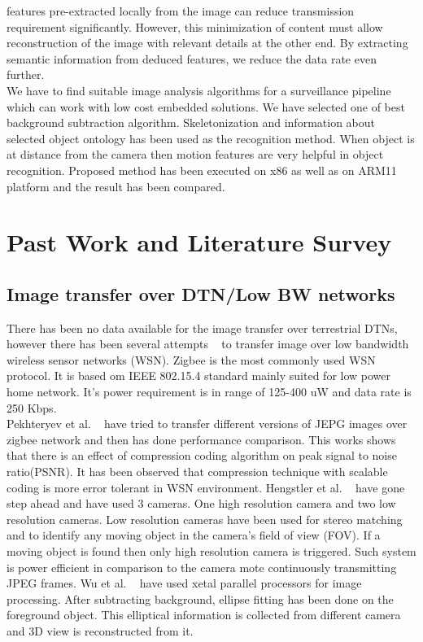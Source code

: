 features pre-extracted locally from the image can reduce transmission
requirement significantly. However, this minimization of content must
allow reconstruction of the image with relevant details at the other
end. By extracting semantic information from deduced features, we
reduce the data rate even further.\\
\indent We have to find suitable image analysis algorithms for a
surveillance pipeline which can work with low cost embedded solutions.
We have selected one of best ~\cite{9} background subtraction algorithm.
Skeletonization and information about selected object ontology has been
used as the recognition method. When object is at distance from the
camera then motion features are very helpful in object recognition.
Proposed method has been executed on x86 as well as on ARM11 platform
and the result has been compared. \\

\pagebreak


\section{Past Work and Literature Survey}

\subsection{Image transfer over DTN/Low BW networks}

\indent There has been no data available for the image transfer over
terrestrial DTNs, however there has been several attempts ~\cite{2, 3,
4, 5} to transfer image over low bandwidth wireless sensor networks
(WSN). Zigbee is the most commonly used WSN protocol. It is based om IEEE
802.15.4 standard mainly suited for low power home network. It's power
requirement is in range of 125-400 uW and data rate is 250 Kbps.\\

\indent Pekhteryev et al. ~\cite{2} have tried to transfer different
versions of JEPG images over zigbee network and then has done
performance comparison.  This works shows that there is an effect of
compression coding algorithm on peak signal to noise ratio(PSNR). It has
been observed that compression technique with scalable coding is more
error tolerant in WSN environment. Hengstler et al. ~\cite{3, 5} have
gone step ahead and have used 3 cameras. One high resolution camera and
two low resolution cameras. Low resolution cameras have been used for
stereo matching and to identify any moving object in the camera's field
of view (FOV). If a moving object is found then only high resolution
camera is triggered. Such system is power efficient in  comparison to
the camera mote continuously transmitting JPEG frames. Wu et al.
~\cite{4} have used xetal parallel processors for image processing.
After subtracting background, ellipse fitting has been done on the
foreground object. This elliptical information is collected from
different camera and 3D view is reconstructed from it.\\

